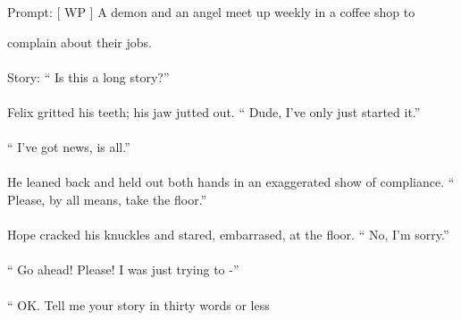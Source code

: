 
\begin{tcolorbox}[
    base style,
    colback=boxcolor,
    coltitle=white,
    colbacktitle=headercolor,
    title=Prefix
]
\text{\#\#\#} Prompt: [ WP ] A demon and an angel meet up weekly in a coffee shop to
\end{tcolorbox}

\vspace{2mm}

\begin{tcolorbox}[
    base style,
    colback=boxcolor,
    coltitle=white,
    colbacktitle=headercolor,
    title=Suffix
]
complain about their jobs.
\\
\\
\text{\#\#\#} Story: `` Is this a long story?'' 
\\
\\
Felix gritted his teeth; his jaw jutted out. `` Dude, I've only just started it.'' 
\\
\\
`` I've got news, is all.'' 
\\
\\
He leaned back and held out both hands in an exaggerated show of compliance. `` Please, by all means, take the floor.'' 
\\
\\
Hope cracked his knuckles and stared, embarrased, at the floor. `` No, I'm sorry.'' 
\\
\\
`` Go ahead! Please! I was just trying to -'' 
\\
\\
`` OK. Tell me your story in thirty words or less
\end{tcolorbox}

\vspace{2mm}

